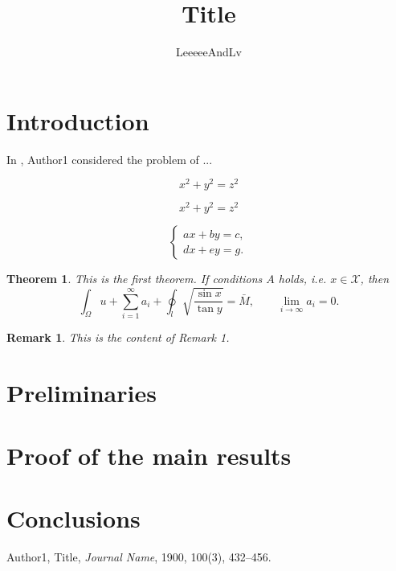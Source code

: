 \documentclass{article}
\title{Title}
\author{LeeeeeAndLv}
\date{}
\newtheorem{thm}{Theorem}
\newtheorem{rmk}{Remark}[section]
\begin{document}
\maketitle

\section{Introduction}

In \cite{Au1900}, Author1 considered the problem of ...

\begin{equation*}
	x^2 + y^2 = z^2
\end{equation*}

\begin{equation}\label{eq:GouGuThm}
	x^2 + y^2 = z^2
\end{equation}

\[
	\left\{
	\begin{aligned}
		a x + b y = c, \\
		d x + e y = g.
	\end{aligned}
	\right.
\]

\begin{thm}
	This is the first theorem. If conditions $A$ holds, i.e. $x\in \mathcal{X}$, then
	\[
		\int_\Omega u + \sum_{i=1}^\infty a_i + \oint_l \sqrt{\frac{\sin x}{\tan y}} = \bar{M}, \qquad \lim_{i\to \infty} a_i = 0.
	\]
\end{thm}

\begin{rmk}
	This is the content of Remark 1. 
\end{rmk}


\section{Preliminaries}

\section{Proof of the main results}

\section{Conclusions}

\begin{thebibliography}{99}
	Author1, Title, {\it Journal Name}, 1900, 100(3), 432--456.  
\end{thebibliography}
\end{document}

